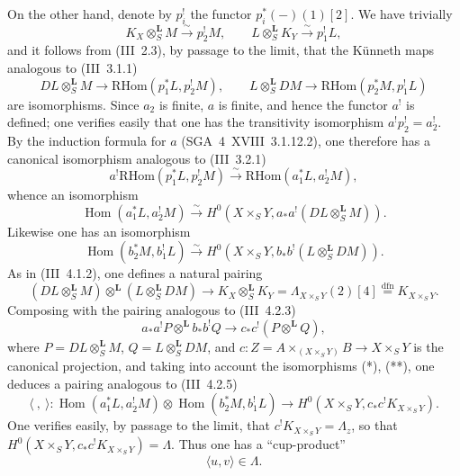 \documentclass[11pt]{article}
\DeclareMathOperator{\Hom}{Hom}
\providecommand{\RHom}{\mathrm{RHom}}
\providecommand{\LL}{\mathbf L}
\providecommand{\RHom}{\mathrm{RHom}}
\providecommand{\Hom}{\operatorname{Hom}}
\providecommand{\RHom}{\mathrm R\mathcal{H}om}
\providecommand{\RHom}{\mathrm{RHom}}
\begin{document}
On the other hand, denote by $p_i^!$ the functor $p_i^*(-)(1)[2]$. We have trivially
\[
K_X\otimes_S^{\LL}M\xrightarrow{\sim}p_2^!M,
\qquad
L\otimes_S^{\LL}K_Y\xrightarrow{\sim}p_1^!L,
\]
and it follows from (III~2.3), by passage to the limit, that the Künneth maps analogous to (III~3.1.1)
\[
DL\otimes_S^{\LL}M\longrightarrow \RHom(p_1^*L,p_2^!M),
\qquad
L\otimes_S^{\LL}DM\longrightarrow \RHom(p_2^*M,p_1^!L)
\]
are isomorphisms. Since $a_2$ is finite, $a$ is finite, and hence the functor $a^!$ is defined; one verifies easily that one has the transitivity isomorphism $a^!p_2^!=a_2^!$. By the induction formula for $a$ (SGA~4~XVIII~3.1.12.2), one therefore has a canonical isomorphism analogous to (III~3.2.1)
\[
a^!\RHom(p_1^*L,p_2^!M)\xrightarrow{\sim}\RHom(a_1^*L,a_2^!M),
\]
whence an isomorphism
\begin{equation}\tag{*}
\Hom(a_1^*L,a_2^!M)\xrightarrow{\sim}H^0(X\times_S Y,a_*a^!(DL\otimes_S^{\LL}M)).
\end{equation}
Likewise one has an isomorphism
\begin{equation}\tag{**}
\Hom(b_2^*M,b_1^!L)\xrightarrow{\sim}H^0(X\times_S Y,b_*b^!(L\otimes_S^{\LL}DM)).
\end{equation}
As in (III~4.1.2), one defines a natural pairing
\[
(DL\otimes_S^{\LL}M)\otimes^{\LL}(L\otimes_S^{\LL}DM)
\longrightarrow K_X\otimes_S^{\LL}K_Y=\Lambda_{X\times_S Y}(2)[4]\stackrel{\mathrm{dfn}}{=}K_{X\times_S Y}.
\]
Composing with the pairing analogous to (III~4.2.3)
\[
a_*a^!P\otimes^{\LL} b_*b^!Q\longrightarrow c_*c^!(P\otimes^{\LL}Q),
\]
where $P=DL\otimes_S^{\LL}M$, $Q=L\otimes_S^{\LL}DM$, and $c:Z=A\times_{(X\times_S Y)}B\to X\times_S Y$ is the canonical projection, and taking into account the isomorphisms (*), (**), one deduces a pairing analogous to (III~4.2.5)
\[
\langle\ ,\ \rangle:\Hom(a_1^*L,a_2^!M)\otimes\Hom(b_2^*M,b_1^!L)
\longrightarrow H^0(X\times_S Y,c_*c^!K_{X\times_S Y}).
\]
One verifies easily, by passage to the limit, that $c^!K_{X\times_S Y}=\Lambda_z$, so that $H^0(X\times_S Y,c_*c^!K_{X\times_S Y})=\Lambda$. Thus one has a ``cup-product''
\begin{equation}\tag{1.1.2}
\langle u,v\rangle\in\Lambda.
\end{equation}
\end{document}
